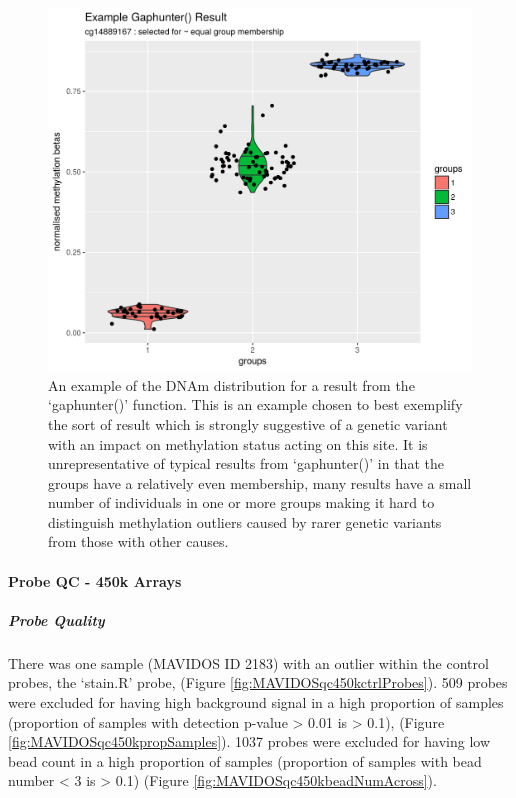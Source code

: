 \documentclass[
]{book}
\begin{document}
\begin{figure}

{\centering \includegraphics[width=0.8\linewidth]{figs/MAVIDOSgaphunterEgMonApr162018} 

}

\caption{An example of the DNAm distribution for a result from the `gaphunter()' function. This is an example chosen to best exemplify the sort of result which is strongly suggestive of a genetic variant with an impact on methylation status acting on this site. It is unrepresentative of typical results from `gaphunter()' in that the groups have a relatively even membership, many results have a small number of individuals in one or more groups making it hard to distinguish methylation outliers caused by rarer genetic variants from those with other causes.}\label{fig:MAVIDOSgaphunterEgMonApr162018}
\end{figure}



\hypertarget{probe-qc---450k-arrays}{%
\paragraph{Probe QC - 450k Arrays}\label{probe-qc---450k-arrays}}

\hypertarget{probe-quality-1}{%
\subparagraph{Probe Quality}\label{probe-quality-1}}

There was one sample (MAVIDOS ID 2183) with an outlier within the control probes, the `stain.R' probe, (Figure \ref{fig:MAVIDOSqc450kctrlProbes}).
509 probes were excluded for having high background signal in a high proportion of samples (proportion of samples with detection p-value \textgreater{} 0.01 is \textgreater{} 0.1), (Figure \ref{fig:MAVIDOSqc450kpropSamples}).
1037 probes were excluded for having low bead count in a high proportion of samples (proportion of samples with bead number \textless{} 3 is \textgreater{} 0.1) (Figure \ref{fig:MAVIDOSqc450kbeadNumAcross}).
\end{document}
